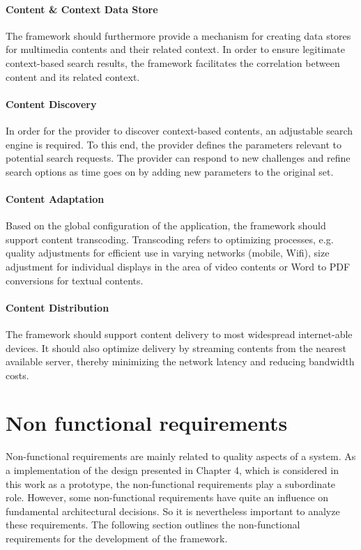 \paragraph{Content \& Context Data Store}
The framework should furthermore provide a mechanism for creating data stores for multimedia contents and their related context. In order to ensure legitimate context-based search results, the framework facilitates the correlation between content and its related context. 

\paragraph{Content Discovery}
In order for the provider to discover context-based contents, an adjustable search engine is required. To this end, the provider defines the parameters relevant to potential search requests. The provider can respond to new challenges and refine search options as time goes on by adding new parameters to the original set.      

\paragraph{Content Adaptation}
Based on the global configuration of the application, the framework should support content transcoding. Transcoding refers to optimizing processes, e.g. quality adjustments for efficient use in varying networks (mobile, Wifi), size adjustment for individual displays in the area of video contents or Word to PDF conversions for textual contents.
  
\paragraph{Content Distribution}
The framework should support content delivery to most widespread internet-able devices. It should also optimize delivery by streaming contents from the nearest available server, thereby minimizing the network latency and reducing bandwidth costs.   

\section{Non functional requirements\label{sec:req_nf_req}}
Non-functional requirements are mainly related to quality aspects of a system. As a implementation of the design presented in Chapter 4, which is considered in this work as a prototype, the non-functional requirements play a subordinate role. However, some non-functional requirements have quite an influence on fundamental architectural decisions. So it is nevertheless important to analyze these requirements. The following section outlines the non-functional requirements for the development of the framework.

